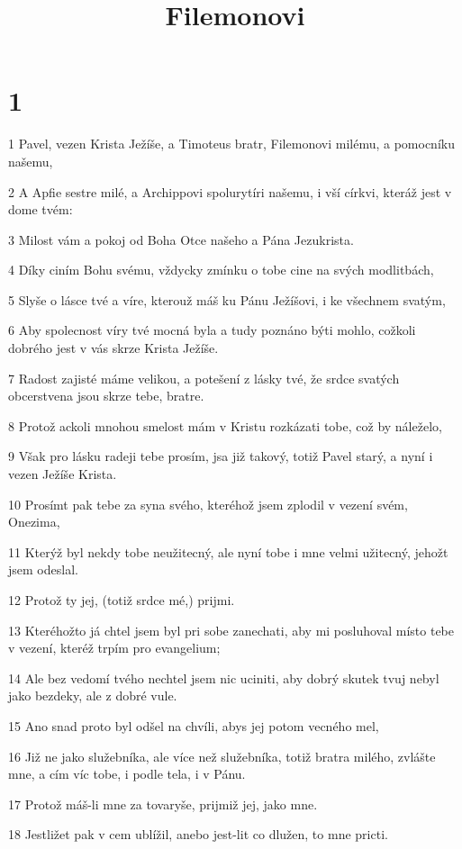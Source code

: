

\title{Filemonovi}

\chapter{1}

\par 1 Pavel, vezen Krista Ježíše, a Timoteus bratr, Filemonovi milému, a pomocníku našemu,
\par 2 A Apfie sestre milé, a Archippovi spolurytíri našemu, i vší církvi, kteráž jest v dome tvém:
\par 3 Milost vám a pokoj od Boha Otce našeho a Pána Jezukrista.
\par 4 Díky ciním Bohu svému, vždycky zmínku o tobe cine na svých modlitbách,
\par 5 Slyše o lásce tvé a víre, kterouž máš ku Pánu Ježíšovi, i ke všechnem svatým,
\par 6 Aby spolecnost víry tvé mocná byla a tudy poznáno býti mohlo, cožkoli dobrého jest v vás skrze Krista Ježíše.
\par 7 Radost zajisté máme velikou, a potešení z lásky tvé, že srdce svatých obcerstvena jsou skrze tebe, bratre.
\par 8 Protož ackoli mnohou smelost mám v Kristu rozkázati tobe, což by náleželo,
\par 9 Však pro lásku radeji tebe prosím, jsa již takový, totiž Pavel starý, a nyní i vezen Ježíše Krista.
\par 10 Prosímt pak tebe za syna svého, kteréhož jsem zplodil v vezení svém, Onezima,
\par 11 Kterýž byl nekdy tobe neužitecný, ale nyní tobe i mne velmi užitecný, jehožt jsem odeslal.
\par 12 Protož ty jej, (totiž srdce mé,) prijmi.
\par 13 Kteréhožto já chtel jsem byl pri sobe zanechati, aby mi posluhoval místo tebe v vezení, kteréž trpím pro evangelium;
\par 14 Ale bez vedomí tvého nechtel jsem nic uciniti, aby dobrý skutek tvuj nebyl jako bezdeky, ale z dobré vule.
\par 15 Ano snad proto byl odšel na chvíli, abys jej potom vecného mel,
\par 16 Již ne jako služebníka, ale více než služebníka, totiž bratra milého, zvlášte mne, a cím víc tobe, i podle tela, i v Pánu.
\par 17 Protož máš-li mne za tovaryše, prijmiž jej, jako mne.
\par 18 Jestližet pak v cem ublížil, anebo jest-lit co dlužen, to mne pricti.
